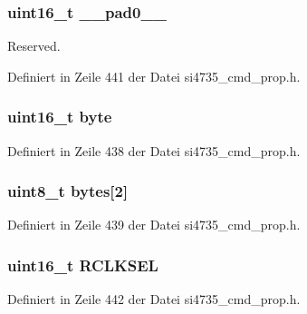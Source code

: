 \subsubsection[{\+\_\+\+\_\+pad0\+\_\+\+\_\+}]{\setlength{\rightskip}{0pt plus 5cm}uint16\+\_\+t \+\_\+\+\_\+pad0\+\_\+\+\_\+}\label{unionrefclk__pre_a77132c2c26a75f5b8751b235cda23828}


Reserved. 



Definiert in Zeile 441 der Datei si4735\+\_\+cmd\+\_\+prop.\+h.

\hypertarget{unionrefclk__pre_ab0549c1b5ea980a02e7eab77e21fea49}{}
\subsubsection[{byte}]{\setlength{\rightskip}{0pt plus 5cm}uint16\+\_\+t byte}\label{unionrefclk__pre_ab0549c1b5ea980a02e7eab77e21fea49}


Definiert in Zeile 438 der Datei si4735\+\_\+cmd\+\_\+prop.\+h.

\hypertarget{unionrefclk__pre_a46e4c05d20a047ec169f60d3167e912e}{}
\subsubsection[{bytes}]{\setlength{\rightskip}{0pt plus 5cm}uint8\+\_\+t bytes\mbox{[}2\mbox{]}}\label{unionrefclk__pre_a46e4c05d20a047ec169f60d3167e912e}


Definiert in Zeile 439 der Datei si4735\+\_\+cmd\+\_\+prop.\+h.

\hypertarget{unionrefclk__pre_a58f70e82912101800a780a4e8d24345d}{}
\subsubsection[{R\+C\+L\+K\+S\+E\+L}]{\setlength{\rightskip}{0pt plus 5cm}uint16\+\_\+t R\+C\+L\+K\+S\+E\+L}\label{unionrefclk__pre_a58f70e82912101800a780a4e8d24345d}


Definiert in Zeile 442 der Datei si4735\+\_\+cmd\+\_\+prop.\+h.

\hypertarget{unionrefclk__pre_a546b4baeb928274149bafc12e1b720ff}{}
